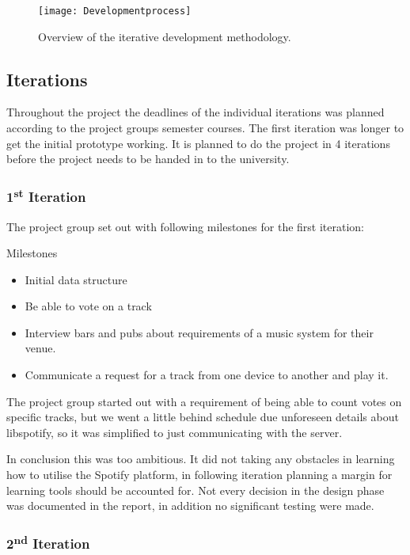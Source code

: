 \begin{figure}[hbtp]
  \centering
  \texttt{[image: Developmentprocess]}
  \caption{Overview of the iterative development methodology.}\label{fig:developmentprocess}
\end{figure}

\subsection{Iterations}

Throughout the project the deadlines of the individual iterations was planned according to the project groups semester courses. The first iteration was longer to get the initial prototype working. It is planned to do the project in 4 iterations before the project needs to be handed in to the university.

\subsubsection{1\textsuperscript{st} Iteration}

	The project group set out with following milestones for the first iteration:

	Milestones
	\begin{itemize}
		\item Initial data structure
		\item Be able to vote on a track
		\item Interview bars and pubs about requirements of a music system for their venue.
		\item Communicate a request for a track from one device to another and play it.
	\end{itemize}

	The project group started out with a requirement of being able to count votes on specific tracks, but we went a little behind schedule due unforeseen details about libspotify, so it was simplified to just communicating with the server.

	In conclusion this was too ambitious. It did not taking any obstacles in learning how to utilise the Spotify platform, in following iteration planning a margin for learning tools should be accounted for. Not every decision in the design phase was documented in the report, in addition no significant testing were made.

\subsubsection{2\textsuperscript{nd} Iteration}

